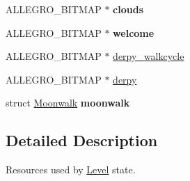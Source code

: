 \begin{DoxyCompactItemize}
\item 
\hypertarget{structLevel_a94266a3fc732a379240d54111cc70cce}{\-A\-L\-L\-E\-G\-R\-O\-\_\-\-B\-I\-T\-M\-A\-P $\ast$ {\bfseries clouds}}\label{structLevel_a94266a3fc732a379240d54111cc70cce}

\item 
\hypertarget{structLevel_a575fec7686bd94b5c35b15d73296c977}{\-A\-L\-L\-E\-G\-R\-O\-\_\-\-B\-I\-T\-M\-A\-P $\ast$ {\bfseries welcome}}\label{structLevel_a575fec7686bd94b5c35b15d73296c977}

\item 
\-A\-L\-L\-E\-G\-R\-O\-\_\-\-B\-I\-T\-M\-A\-P $\ast$ \hyperlink{structLevel_ab6a78c50cda8424f722ca249f5466f67}{derpy\-\_\-walkcycle}
\item 
\-A\-L\-L\-E\-G\-R\-O\-\_\-\-B\-I\-T\-M\-A\-P $\ast$ \hyperlink{structLevel_ae33832497116b7a0c184959bbde21ee5}{derpy}
\item 
\hypertarget{structLevel_ab9e39b9ac0f342332e034c59d55d6a07}{struct \hyperlink{structMoonwalk}{\-Moonwalk} {\bfseries moonwalk}}\label{structLevel_ab9e39b9ac0f342332e034c59d55d6a07}

\end{DoxyCompactItemize}


\subsection{\-Detailed \-Description}
\-Resources used by \hyperlink{structLevel}{\-Level} state. 

